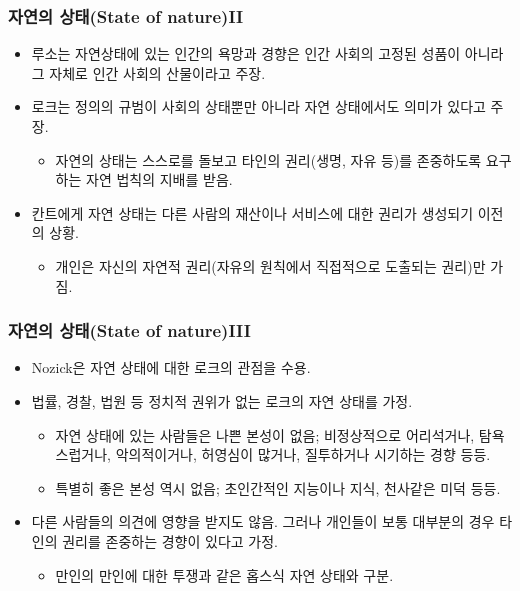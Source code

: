\documentclass[aspectratio=169,xcolor=dvipsnames,handout]{beamer}
\begin{document}
\begin{frame}[<+->]
\frametitle{자연의 상태(State of nature)II}
    \begin{itemize}
        \item 루소는 자연상태에 있는 인간의 욕망과 경향은 인간 사회의 고정된 성품이 아니라 그 자체로 인간 사회의 산물이라고 주장.
        \item 로크는 정의의 규범이 사회의 상태뿐만 아니라 자연 상태에서도 의미가 있다고 주장.
        \begin{itemize}
            \item 자연의 상태는 스스로를 돌보고 타인의 권리(생명, 자유 등)를 존중하도록 요구하는 자연 법칙의 지배를 받음.
        \end{itemize}
        \item 칸트에게 자연 상태는 다른 사람의 재산이나 서비스에 대한 권리가 생성되기 이전의 상황.
        \begin{itemize}
            \item 개인은 자신의 자연적 권리(자유의 원칙에서 직접적으로 도출되는 권리)만 가짐.
        \end{itemize}
    \end{itemize}
\end{frame}

\begin{frame}[<+->]
\frametitle{자연의 상태(State of nature)III}
    \begin{itemize}
        \item Nozick은 자연 상태에 대한 로크의 관점을 수용.
        \item  법률, 경찰, 법원 등 정치적 권위가 없는 로크의 자연 상태를 가정.
        \begin{itemize}
           \item  자연 상태에 있는 사람들은 나쁜 본성이 없음; 비정상적으로 어리석거나, 탐욕스럽거나, 악의적이거나, 허영심이 많거나, 질투하거나 시기하는 경향 등등.
           \item  특별히 좋은 본성 역시 없음; 초인간적인 지능이나 지식, 천사같은 미덕 등등.
        \end{itemize}
       \item  다른 사람들의 의견에 영향을 받지도 않음. 그러나 개인들이 보통 대부분의 경우 타인의 권리를 존중하는 경향이 있다고 가정.
        \begin{itemize}
            \item 만인의 만인에 대한 투쟁과 같은 홉스식 자연 상태와 구분.
        \end{itemize}
    \end{itemize}
\end{frame}
\end{document}
